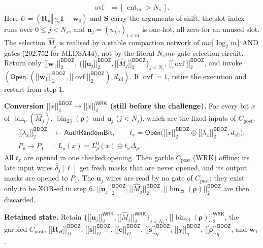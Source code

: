 \documentclass[10pt,letterpaper]{article}
\newcommand{\typedshare}[3]{\mathopen{[\![}#1\mathclose{]\!]}_{#2}^{\mathsf{#3}}}
\newcommand{\sh}[2]{\typedshare{#1}{#2}{BDOZ}}
\newcommand{\ws}[1]{\typedshare{#1}{2}{WRK}}
\newcommand{\vct}[1]{\bm{#1}}
\newcommand{\one}{\mathbf{1}}
\newcommand{\bin}{\operatorname{bin}}
\newcommand{\cnt}{\operatorname{cnt}}
\newcommand{\ovf}{\operatorname{ovf}}
\newcommand{\Open}{\mathsf{Open}}
\newcommand{\post}{C_{\mathrm{post}}}
\newcommand{\dall}{d_{\mathrm{all}}}
\begin{document}
\begin{mdframed}[style=protocol]
\begin{enumerate}
\begin{align*}
\ovf&=[\,\cnt_m>N_s\,].
\end{align*}
Here $U=(\vct{R}_y\mathbin\Vert\gamma_2\one-\vct{w}_0)$ and $\vct{S}$ carry
the arguments of shift, the slot index runs over $0\leq j<N_s$, and
$\vct{u}_j=(u_{j,i})_{i<m}$ is one-hot, all zero for an unused slot. The selection
$\widehat M_j$ is realised by a stable compaction network of
$m\nu\lceil\log_2m\rceil$ AND gates (202,752 for MLDSA44), not by the literal
$N_sm\nu$-gate selection circuit. Return only $\sh{\vct{w}_1}{2}$,
$\{\sh{\vct{u}_j}{2},\sh{\widehat M_j}{2}\}_{j<N_s}$, $\sh{\ovf}{2}$,
and invoke $(\Open,(\sh{\vct{w}_1}{2},\sh{\ovf}{2}),\dall)$.
If $\ovf=1$, retire the execution and restart from step 1.
\end{enumerate}
\textbf{Conversion $\sh{x}{2}\rightarrow\ws{x}$ (still before the challenge).}
For every bit $x$ of $\bin_\nu(\widehat M_j)$, $\bin_{23}(\vct{\rho})$ and
$\vct{u}_j$ ($j<N_s$), which are the fixed inputs of $\post$:
\begin{align*}
\sh{\lambda_x}{2}&\leftarrow\mathsf{AuthRandomBit},\qquad
t_x=\Open\bigl(\sh{x}{2}\oplus\sh{\lambda_x}{2},\dall\bigr),\\
P_p\rightarrow P_1&:\ L_p(x)=L_p^0(x)\oplus t_x\Delta_p .
\end{align*}
All $t_x$ are opened in one checked opening. Then garble $\post$ (WRK) offline;
its late input wires $\widehat\delta_j[\ell]$ get fresh masks that are
never opened, and its output masks are opened to $P_1$. The $\vct{u}_j$ wires are
read by no gate of $\post$; they exist only to be XOR-ed in step 6.
$\sh{\vct{u}_j}{2},\sh{\widehat M_j}{2},\sh{\bin_{23}(\vct{\rho})}{2}$ are then discarded.

\textbf{Retained state.} Retain
$\{\ws{\vct{u}_j},\ws{\widehat M_j}\}_{j<N_s}$, $\ws{\bin_{23}(\vct{\rho})}$,
the garbled $\post$,
$\sh{\vct{R}_H}{D}$, $\sh{\vct{s}}{D}$, $\sh{\vct{e}}{D}$, $\sh{\vct{s}}{q}$,
$\sh{\vct{y}}{q}$, $\sh{\vct{\rho}}{q}$, and $\vct{w}_1$.


\end{mdframed}
\end{document}
